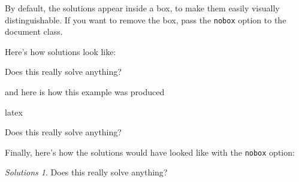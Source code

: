 \documentclass{pset}
\theoremstyle{remark}
\newtheorem*{solutionsa}{Solutions}
\begin{document}
By default, the solutions appear inside a box, to make them easily visually distinguishable. If you want to remove the box, pass the \texttt{nobox} option to the document class.

Here's how solutions look like:
\begin{solutions}
Does this really solve anything?
\end{solutions}
and here is how this example was produced
\begin{tminted}{latex}
\begin{solutions}
    Does this really solve anything?
\end{solutions}
\end{tminted}

Finally, here's how the solutions would have looked like with the \texttt{nobox} option:
\begin{solutionsa}
Does this really solve anything?
\end{solutionsa}
\end{document}
